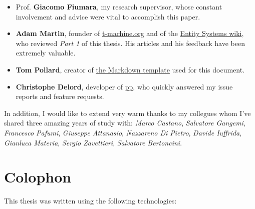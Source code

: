 \documentclass[twoside, 12pt, a4paper, openright]{book}
\begin{document}
\begin{itemize}
\item
  Prof. \textbf{Giacomo Fiumara}, my research supervisor, whose constant
  involvement and advice were vital to accomplish this paper.
\item
  \textbf{Adam Martin}, founder of
  \href{http://t-machine.org/}{t-machine.org} and of the
  \href{http://entity-systems.wikidot.com/}{Entity Systems wiki}, who
  reviewed \emph{Part 1} of this thesis. His articles and his feedback
  have been extremely valuable.
\item
  \textbf{Tom Pollard}, creator of
  \href{https://github.com/tompollard/phd_thesis_markdown}{the Markdown
  template} used for this document.
\item
  \textbf{Christophe Delord}, developer of
  \href{https://github.com/CDSoft/pp}{pp}, who quickly answered my issue
  reports and feature requests.
\end{itemize}

In addition, I would like to extend very warm thanks to my collegues
whom I've shared three amazing years of study with: \emph{Marco
Castano}, \emph{Salvatore Gangemi}, \emph{Francesco Pafumi},
\emph{Giuseppe Attanasio}, \emph{Nazzareno Di Pietro}, \emph{Davide
Iuffrida}, \emph{Gianluca Materia}, \emph{Sergio Zavettieri},
\emph{Salvatore Bertoncini}.

\chapter*{Colophon}\label{colophon}

This thesis was written using the following technologies:
\end{document}
